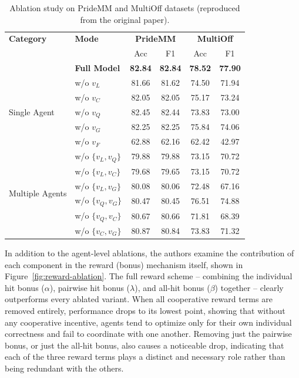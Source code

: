 \documentclass[manuscript,review]{acmart}
\begin{document}
\begin{table}[h]
\centering
\caption{Ablation study on PrideMM and MultiOff datasets (reproduced from the original
paper).}
\label{tab:ablation}
\begin{tabular}{ll|cc|cc}
\toprule
\textbf{Category} & \textbf{Mode} & \multicolumn{2}{c|}{\textbf{PrideMM}} & \multicolumn{2}{c}{\textbf{MultiOff}} \\
 & & Acc & F1 & Acc & F1 \\
\midrule
 & \textbf{Full Model} & \textbf{82.84} & \textbf{82.84} & \textbf{78.52} & \textbf{77.90} \\
\midrule
\multirow{5}{*}{Single Agent}
 & w/o $v_L$ & 81.66 & 81.62 & 74.50 & 71.94 \\
 & w/o $v_C$ & 82.05 & 82.05 & 75.17 & 73.24 \\
 & w/o $v_Q$ & 82.45 & 82.44 & 73.83 & 73.00 \\
 & w/o $v_G$ & 82.25 & 82.25 & 75.84 & 74.06 \\
 & w/o $v_F$ & 62.88 & 62.16 & 62.42 & 42.97 \\
\midrule
\multirow{6}{*}{Multiple Agents}
 & w/o $\{v_L, v_Q\}$ & 79.88 & 79.88 & 73.15 & 70.72 \\
 & w/o $\{v_L, v_C\}$ & 79.68 & 79.65 & 73.15 & 70.72 \\
 & w/o $\{v_L, v_G\}$ & 80.08 & 80.06 & 72.48 & 67.16 \\
 & w/o $\{v_Q, v_G\}$ & 80.47 & 80.45 & 76.51 & 74.88 \\
 & w/o $\{v_Q, v_C\}$ & 80.67 & 80.66 & 71.81 & 68.39 \\
 & w/o $\{v_C, v_G\}$ & 80.87 & 80.84 & 73.83 & 71.32 \\
\bottomrule
\end{tabular}
\end{table}

In addition to the agent-level ablations, the authors examine the contribution of each
component in the reward (bonus) mechanism itself, shown in Figure~\ref{fig:reward-ablation}.
The full reward scheme -- combining the individual hit bonus ($\alpha$), pairwise hit
bonus ($\lambda$), and all-hit bonus ($\beta$) together -- clearly outperforms every
ablated variant. When all cooperative reward terms are removed entirely, performance
drops to its lowest point, showing that without any cooperative incentive, agents tend to
optimize only for their own individual correctness and fail to coordinate with one
another. Removing just the pairwise bonus, or just the all-hit bonus, also causes a
noticeable drop, indicating that each of the three reward terms plays a distinct and
necessary role rather than being redundant with the others.
\end{document}
